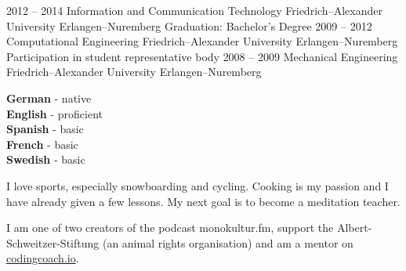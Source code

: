 \documentclass[9pt]{developercv} %
\begin{document}

\begin{entrylist}
	\entry
		{2012 -- 2014}
		{Information and Communication Technology}
		{Friedrich–Alexander University Erlangen–Nuremberg}
		{Graduation: Bachelor's Degree}
	\entry
		{2009 -- 2012}
		{Computational Engineering}
		{Friedrich–Alexander University Erlangen–Nuremberg}
		{Participation in student representative body}
	\entry
		{2008 -- 2009}
		{Mechanical Engineering}
		{Friedrich–Alexander University Erlangen–Nuremberg}
		{}
\end{entrylist}
\vspace{0.8cm}



\begin{minipage}[t]{0.3\textwidth}
	\vspace{-\baselineskip} %

	
	\textbf{German} - native\\
	\textbf{English} - proficient\\
	\textbf{Spanish} - basic\\
	\textbf{French} - basic\\
	\textbf{Swedish} - basic
\end{minipage}
\hfill
\begin{minipage}[t]{0.3\textwidth}
	\vspace{-\baselineskip} %
	
	
  I love sports, especially snowboarding and cycling.
  Cooking is my passion and I have already given a few lessons.
  My next goal is to become a meditation teacher.
\end{minipage}
\hfill
\begin{minipage}[t]{0.3\textwidth}
	\vspace{-\baselineskip} %
	
  
  I am one of two creators of the podcast monokultur.fm,
  support the Albert-Schweitzer-Stiftung (an animal rights organisation)
  and am a mentor on \href{https://mentors.codingcoach.io/}{codingcoach.io}.
\end{minipage}



\end{document}
